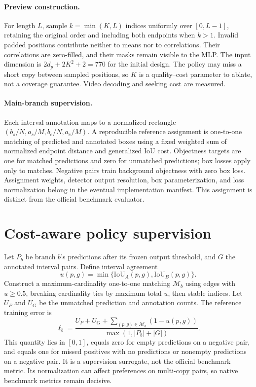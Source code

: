 \documentclass[10pt,twocolumn,letterpaper]{article}
\begin{document}
\paragraph{Preview construction.}
For length $L$, sample $k=\min(K,L)$ indices uniformly over $[0,L-1]$, retaining the original
order and including both endpoints when $k>1$. Invalid padded positions contribute neither
to means nor to correlations. Their correlations are zero-filled, and their masks remain
visible to the MLP. The input dimension is $2d_p+2K^2+2=770$ for the initial design.
The policy may miss a short copy between sampled positions, so $K$ is a quality--cost
parameter to ablate, not a coverage guarantee. Video decoding and seeking cost are measured.

\paragraph{Main-branch supervision.}
Each interval annotation maps to a normalized rectangle
$(b_s/N,a_s/M,b_e/N,a_e/M)$. A reproducible reference assignment is one-to-one matching of
predicted and annotated boxes using a fixed weighted sum of normalized endpoint distance
and generalized IoU cost. Objectness targets are one for matched predictions and zero for
unmatched predictions; box losses apply only to matches. Negative pairs train background
objectness with zero box loss. Assignment weights, detector output resolution, box
parameterization, and loss normalization belong in the eventual implementation manifest.
This assignment is distinct from the official benchmark evaluator.

\section{Cost-aware policy supervision}
\label{sec:s-targets}
Let $P_b$ be branch $b$'s predictions after its frozen output threshold, and $G$ the annotated
interval pairs. Define interval agreement
\begin{equation}
u(p,g)=\min\{\mathrm{IoU}_A(p,g),\mathrm{IoU}_B(p,g)\}.
\end{equation}
Construct a maximum-cardinality one-to-one matching $\mathcal M_b$ using edges with
$u\ge0.5$, breaking cardinality ties by maximum total $u$, then stable indices. Let
$U_P$ and $U_G$ be the unmatched prediction and annotation counts. The reference training
error is
\begin{equation}
\ell_b=
\frac{U_P+U_G+\sum_{(p,g)\in\mathcal M_b}(1-u(p,g))}
{\max(1,|P_b|+|G|)}.
\label{eq:s-error}
\end{equation}
This quantity lies in $[0,1]$, equals zero for empty predictions on a negative pair, and
equals one for missed positives with no predictions or nonempty predictions on a negative
pair. It is a supervision surrogate, not the official benchmark metric. Its normalization
can affect preferences on multi-copy pairs, so native benchmark metrics remain decisive.
\end{document}
